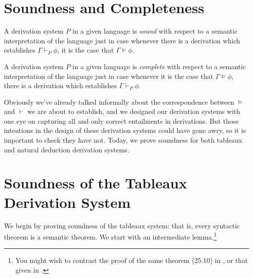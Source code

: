 \section{Soundness and Completeness} \label{sec:tsoundcomp}


A derivation system $P$ in a given language is \emph{sound} with respect to a semantic interpretation of the language just in case whenever there is a derivation which establishes $\Gamma \vdash_{P} \phi$, it is the case that $\Gamma \vDash \phi$.

A derivation system $P$ in a given language is \emph{complete} with respect to a semantic interpretation of the language just in case whenever it is the case that $\Gamma \vDash \phi$, there is a derivation which establishes $\Gamma \vdash_{P} \phi$.

Obviously we've already talked informally about the correspondence between $\vDash$ and $\vdash$ we are about to establish, and we designed our derivation systems with one eye on capturing all and only correct entailments in derivations. But those intentions in the design of these derivation systems could have gone awry, so it is important to check they have not. Today, we prove soundness for both tableaux and natural deduction derivation systems.


\section{Soundness of the Tableaux Derivation System}

We begin by proving soundness of the tableaux system: that is, every syntactic theorem is a semantic theorem. We start with an intermediate lemma.\footnote{You might wish to contrast the proof of the same theorem (25.10) in \citet[118--9]{hodges}, or that given in \citet[{\S}4.5]{bosintlo}.}

